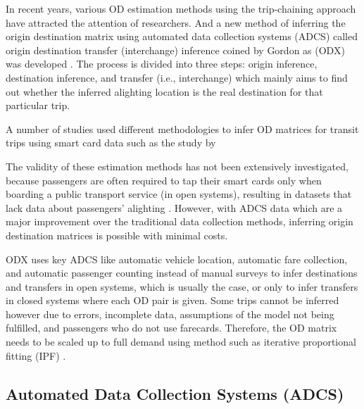 \documentclass[11pt,twoside]{article}
\numberwithin{equation}{section}
\newcommand{\?}{\stackrel{?}{=}}
\begin{document}
In recent years, various OD estimation methods using the trip-chaining approach have attracted the attention of researchers. And a new method of inferring the origin destination matrix using automated data collection systems (ADCS) called origin destination transfer (interchange) inference coined by Gordon as (ODX) was  developed \citep{vanderwaartPlanningTransitNetworks2016, sanchez-martinezInferencePublicTransportation2017}. The process  is divided into three steps: origin inference, destination inference, and transfer (i.e., interchange) which mainly aims to find out whether the inferred alighting location is the real destination for that particular trip. 
 
A number of studies used different methodologies to infer OD matrices for transit trips using smart card data such as the study by \citet{wangBusPassengerOrigindestination2010, nassirTransitStopLevelOrigin2011, gordonIntermodalPassengerFlows2012}

The validity of these estimation methods has not been extensively investigated, because passengers are often required to tap their smart cards only when boarding a public transport service (in open systems), resulting in datasets that lack data about passengers' alighting \citep{alsgerValidatingImprovingPublic2016}. However, with ADCS data which are a major improvement over the traditional data collection methods, inferring origin destination matrices is possible with minimal costs.

ODX uses key ADCS like automatic vehicle location, automatic fare collection, and automatic passenger counting instead of manual surveys to infer destinations and transfers in open systems, which is usually the case, or only to infer transfers in closed systems where each OD pair is given. Some trips cannot be inferred however due to errors, incomplete data, assumptions of the model not being fulfilled, and passengers who do not use farecards. Therefore, the OD matrix needs to be scaled up to full demand using method such as iterative proportional fitting (IPF) \citep{vanderwaartPlanningTransitNetworks2016, cuiBusPassengerOriginDestination2006}. 







\subsection{Automated Data Collection Systems (ADCS)}
\end{document}
